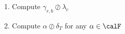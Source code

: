 \begin{problem}
        \begin{enumerate}
                \item Compute $\gamma_{r,b} \oslash \lambda_{c}$
                \item Compute $\alpha \oslash \delta_{T}$ for any $\alpha \in \calF$
        \end{enumerate}
\end{problem}
